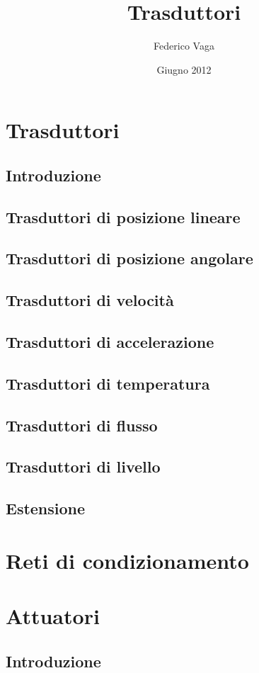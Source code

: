 \documentclass[a4paper,10pt]{book}
\title{Trasduttori}
\author{Federico Vaga}
\date{Giugno 2012}
\begin{document}


\tableofcontents
\listoffigures

\part{Trasduttori}
\chapter{Introduzione}

\chapter{Trasduttori di posizione lineare}

\chapter{Trasduttori di posizione angolare}

\chapter{Trasduttori di velocità}

\chapter{Trasduttori di accelerazione}

\chapter{Trasduttori di temperatura}

\chapter{Trasduttori di flusso}

\chapter{Trasduttori di livello}

\chapter{Estensione}


\part{Reti di condizionamento}

\part{Attuatori}
\chapter{Introduzione}

\end{document}

